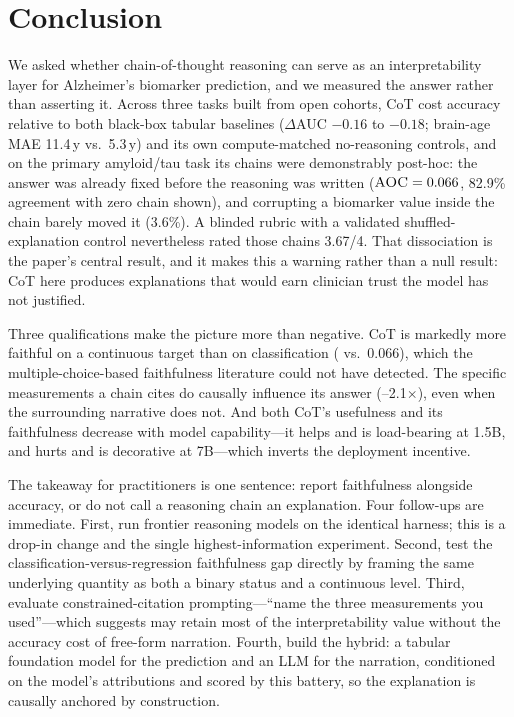 \section{Conclusion}
\label{sec:conclusion}

We asked whether chain-of-thought reasoning can serve as an interpretability layer for Alzheimer's
biomarker prediction, and we measured the answer rather than asserting it. Across three tasks built
from open cohorts, CoT cost accuracy relative to both black-box tabular baselines
($\Delta$AUC $-0.16$ to $-0.18$; brain-age MAE 11.4\,y vs.\ 5.3\,y) and its own compute-matched
no-reasoning controls, and on the primary amyloid/tau task its chains were demonstrably post-hoc:
the answer was already fixed before the reasoning was written ($\textsc{AOC} = 0.066$, 82.9\% agreement with
zero chain shown), and corrupting a biomarker value inside the chain barely moved it (3.6\%). A
blinded rubric with a validated shuffled-explanation control nevertheless rated those chains 3.67/4.
That dissociation is the paper's central result, and it makes this a warning rather than a null
result: CoT here produces explanations that would earn clinician trust the model has not justified.

Three qualifications make the picture more than negative. CoT is markedly more faithful on a
continuous target than on classification ( vs.\ 0.066), which the multiple-choice-based
faithfulness literature could not have detected. The specific measurements a chain cites do causally
influence its answer (--2.1$\times$), even when the surrounding narrative does not. And
both CoT's usefulness and its faithfulness decrease with model capability---it helps and is
load-bearing at 1.5B, and hurts and is decorative at 7B---which inverts the deployment incentive.

The takeaway for practitioners is one sentence: report faithfulness alongside accuracy, or do not
call a reasoning chain an explanation. Four follow-ups are immediate. First, run frontier reasoning
models on the identical harness; this is a drop-in change and the single highest-information
experiment. Second, test the classification-versus-regression faithfulness gap directly by framing
the same underlying quantity as both a binary status and a continuous level. Third, evaluate
constrained-citation prompting---``name the three measurements you used''---which \cfit suggests may
retain most of the interpretability value without the accuracy cost of free-form narration. Fourth,
build the hybrid: a tabular foundation model for the prediction and an LLM for the narration,
conditioned on the model's attributions and scored by this battery, so the explanation is causally
anchored by construction.
